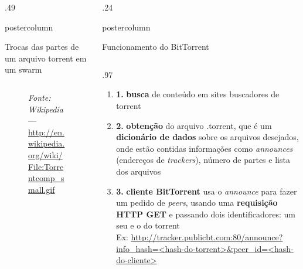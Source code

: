 \documentclass[final,brazil]{beamer}
\newenvironment{innercol}[3][.97\textwidth]{
\begin{columns}
  \hspace{#2}
  \begin{column}{#1}
    \vspace{#3}
    \justifying
}{
  \end{column}
\end{columns}
}
\newlength{\columnheight}
\begin{document}
\begin{frame}
\begin{columns}
\begin{column}{.49\textwidth}
\begin{beamercolorbox}[center,wd=\textwidth]{postercolumn}
\begin{minipage}[T]{.95\textwidth}
{\begin{block}{Trocas das partes de um arquivo torrent em um swarm}
\begin{innercol}[\textwidth]{-2ex}{0ex}
\begin{figure}[H]
\begin{subfigure}[H]{\myhsize}
                  \end{subfigure}%
                  \caption*{\emph{Fonte: Wikipedia} --- \url{http://en.wikipedia.org/wiki/File:Torrentcomp_small.gif}}
                \end{figure}
              \end{innercol}
            \end{block}
          }
        \end{minipage}
      \end{beamercolorbox}
    \end{column}

    \begin{column}{.24\textwidth}
      \begin{beamercolorbox}[center,wd=\textwidth]{postercolumn}
        \begin{minipage}[T]{.95\textwidth}  %
          \parbox[t][\columnheight]{\textwidth}{ %

            \begin{block}{Funcionamento do BitTorrent}
              \begin{innercol}{-6ex}{-1.4ex}
                \begin{enumerate}
                  \justifying
                  \item \textbf{1.} \textbf{busca} de conteúdo em sites buscadores de
                  torrent

                  \item \textbf{2.} \textbf{obtenção} do arquivo .torrent, que é um
                    \textbf{dicionário de dados} sobre os arquivos desejados, onde estão
                    contidas informações como \emph{announces} (endereços de
                    \emph{trackers}), número de partes e lista dos arquivos

                  \item \textbf{3.} \textbf{cliente BitTorrent} usa o \emph{announce}
                    para fazer um pedido de \emph{peers}, usando uma \textbf{requisição
                    HTTP GET} e passando dois identificadores: um seu e o do torrent \\
                    \flushleft Ex: \url{http://tracker.publicbt.com:80/announce?info_hash=<hash-do-torrent>&peer_id=<hash-do-cliente>}


\end{enumerate}
\end{innercol}
\end{block}}
\end{minipage}
\end{beamercolorbox}
\end{column}
\end{columns}
\end{frame}
\end{document}
